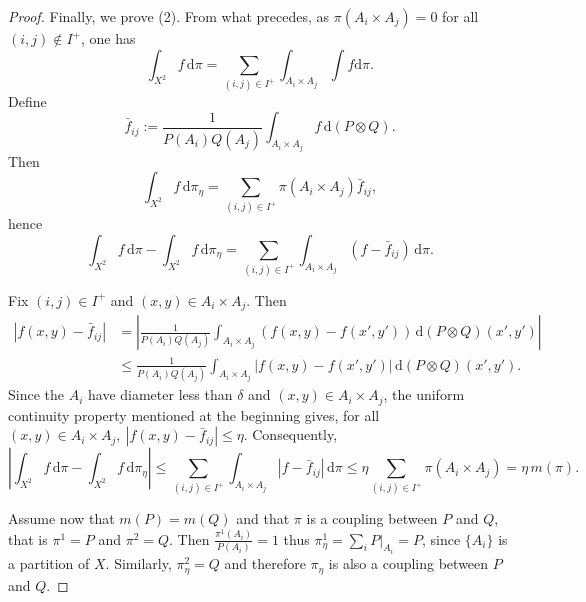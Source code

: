 \documentclass{article}
\theoremstyle{plain}
\theoremstyle{definition}
\theoremstyle{remark}
\begin{document}
\begin{proof}
Finally, we prove (2). From what precedes, as $\pi(A_i\times A_j)=0$ for all $(i,j)\notin I^+$, one has
\[
\int_{X^2} f\, \mathrm{d}\pi = \sum_{(i,j)\in I^+}
\int_{A_i\times A_j} \int f \mathrm{d}\pi.
\]
Define
\[
\bar f_{ij}
:=
\frac1{P(A_i)Q(A_j)}
\int_{A_i\times A_j}
f\, \mathrm{d}(P\otimes Q).
\]
Then
\[
\int_{X^2} f\, \mathrm{d}\pi_\eta
=
\sum_{(i,j)\in I^+}
\pi(A_i\times A_j)\bar f_{ij},
\]
hence
\[
\int_{X^2} f\, \mathrm{d}\pi
-
\int_{X^2} f\, \mathrm{d}\pi_\eta
=
\sum_{(i,j)\in I^+}
\int_{A_i\times A_j}
(f-\bar f_{ij})\, \mathrm{d}\pi.
\]

Fix \((i,j)\in I^+\) and \((x,y)\in A_i\times A_j\). Then
\[
\begin{aligned}
|f(x,y)-\bar f_{ij}|
&=
\left|
\frac1{P(A_i)Q(A_j)}
\int_{A_i\times A_j}
(f(x,y)-f(x',y'))
\,\mathrm{d}(P\otimes Q)(x',y')
\right| \\
&\le
\frac1{P(A_i)Q(A_j)}
\int_{A_i\times A_j}
|f(x,y)-f(x',y')|
\,\mathrm{d}(P\otimes Q)(x',y').
\end{aligned}
\]
Since the $A_i$ have diameter less than $\delta$ and $(x,y) \in A_i \times A_j$, the uniform continuity property mentioned at the beginning gives, for all $(x,y) \in A_i \times A_j, ~
|f(x,y)-\bar f_{ij}|
\le \eta.
$
Consequently,
\[
\left|
\int_{X^2} f\, \mathrm{d}\pi
-
\int_{X^2} f\, \mathrm{d}\pi_\eta
\right|
\le
\sum_{(i,j)\in I^+}
\int_{A_i\times A_j}
|f-\bar f_{ij}|\, \mathrm{d}\pi 
\le
\eta
\sum_{(i,j)\in I^+}
\pi(A_i\times A_j) 
=
\eta\, m(\pi).
\]

Assume now that \(m(P)=m(Q)\) and that \(\pi\) is a coupling between \(P\) and \(Q\), that is $\pi^1 = P$ and $\pi^2 = Q$. Then $\frac{\pi^1(A_i)}{P(A_i)}=1$
thus $\pi_\eta^1
=
\sum_i P|_{A_i}
=
P$,
since \(\{A_i\}\) is a partition of \(X\). Similarly, $
\pi_\eta^2=Q$ and therefore \(\pi_\eta\) is also a coupling between \(P\) and \(Q\).
\end{proof}
\end{document}
